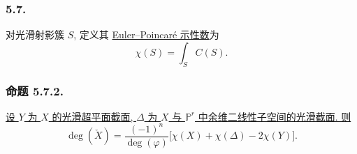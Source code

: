 \subsubsection*{5.7.}
对光滑射影簇 $S$, 定义其 \underline{Euler--Poincaré 示性数}为
\begin{equation}\tag{5.7.1}
\chi(S)=\int_SC(S).
\end{equation}

\subsubsection*{命题 5.7.2.}
\underline{设 $Y$ 为 $X$ 的光滑超平面截面, $\Delta$ 为 $X$ 与 $\mathbb P^r$ 中余维二线性子空间的光滑截面. 则}
\begin{equation}\tag{5.7.3}
\deg(\check X)
=\frac{(-1)^n}{\deg(\varphi)}
\bigl[\chi(X)+\chi(\Delta)-2\chi(Y)\bigr].
\end{equation}

